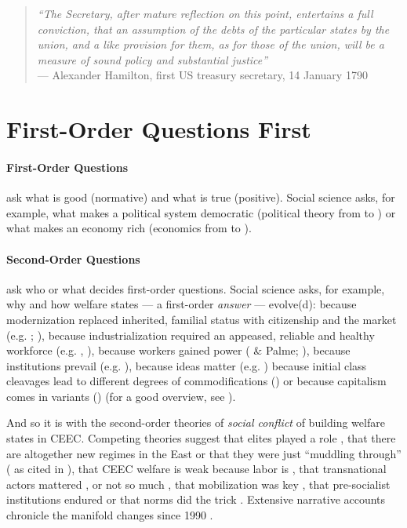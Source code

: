 \documentclass[11pt,a4paper,oneside,openright]{article}
\begin{document}
\begin{quote}
	\emph{``The Secretary, after mature reflection on this point, entertains a full conviction, that an assumption of the debts of the particular states by the union, and a like provision for them, as for those of the union, will be a measure of sound policy and substantial justice''\\}
	--- Alexander Hamilton, first US treasury secretary, 14 January 1790
\end{quote}

\newpage

\section{First-Order Questions First}%

\paragraph{First-Order Questions} ask what is good (normative) and what is true (positive). 
Social science asks, for example, what makes a political system democratic (political theory from \citeauthor{Aristoteles} to \citeauthor{Dahl-1989-aa}) or what makes an economy rich (economics from \citeauthor{Smith-1776-lq} to \citeauthor{Hicks1939}).

\paragraph{Second-Order Questions} ask who or what decides first-order questions. 
Social science asks, for example, why and how welfare states --- a first-order \emph{answer} --- evolve(d): 
	because modernization replaced inherited, familial status with citizenship and the market (e.g. \citeauthor{Titmuss1974}; \citeauthor{Marshall-1950-aa}), 
	because industrialization required an appeased, reliable and healthy workforce (e.g. \citeauthor{Flora1981}, \citeauthor{Wilensky1975}), 
	because workers gained power (\citeauthor{Korpi1983} \& Palme; \citeauthor{Jessop2002}), 
	because institutions prevail (e.g. \citeauthor{Rothstein}), 
	because ideas matter (e.g. \citeauthor{Stiller2009}) because initial class cleavages lead to different degrees of commodifications (\citeauthor{Esping-Andersen-1990-aa}) or 
	because capitalism comes in variants (\citeauthor{HallSoskice-2001-aa}) (for a good overview, see \citealt{Beland2008}).

And so it is with the second-order theories of \emph{social conflict} of building welfare states in \gls{CEEC}. 
Competing theories suggest that elites played a role \citep{Aidukaite2006}, 
	that there are altogether new regimes in the East \citep{Cerami2006} or 
	that they were just ``muddling through'' (\citealt{Kovasc} as cited in \citealt[28]{Fuchs2008}), 
	that \gls{CEEC} welfare is weak because labor is \citep{Crowley2002}, 
	that transnational actors mattered \citep{Orenstein2009}, or not so much \citep{Sissenich2005}, 
	that mobilization was key \citep{Vanhuysse2006a}, 
	that pre-socialist institutions endured \citep{Inglot2008} or that norms did the trick \citep{Schimmelfennig2001}. 
Extensive narrative accounts chronicle the manifold changes since 1990 \citep[e.g.][ed]{Deacon1992}. 
\end{document}
